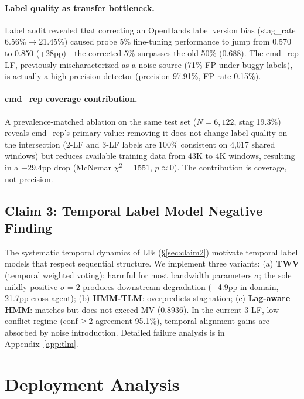 \documentclass[11pt,a4paper]{article}
\begin{document}
\paragraph{Label quality as transfer bottleneck.}
Label audit revealed that correcting an OpenHands label version bias (stag\_rate 6.56\%$\to$21.45\%) caused probe 5\% fine-tuning performance to jump from 0.570 to 0.850 (+28pp)---the corrected 5\% surpasses the old 50\% (0.688). The cmd\_rep LF, previously mischaracterized as a noise source (71\% FP under buggy labels), is actually a high-precision detector (precision 97.91\%, FP rate 0.15\%).

\paragraph{cmd\_rep coverage contribution.}
A prevalence-matched ablation on the same test set ($N{=}6{,}122$, stag 19.3\%) reveals cmd\_rep's primary value: removing it does not change label quality on the intersection (2-LF and 3-LF labels are 100\% consistent on 4,017 shared windows) but reduces available training data from 43K to 4K windows, resulting in a $-$29.4pp drop (McNemar $\chi^2{=}1551$, $p{\approx}0$). The contribution is coverage, not precision.

\subsection{Claim 3: Temporal Label Model Negative Finding}
\label{sec:claim3}

The systematic temporal dynamics of LFs (\S\ref{sec:claim2}) motivate temporal label models that respect sequential structure. We implement three variants: (a) \textbf{TWV} (temporal weighted voting): harmful for most bandwidth parameters $\sigma$; the sole mildly positive $\sigma{=}2$ produces downstream degradation ($-$4.9pp in-domain, $-$21.7pp cross-agent); (b) \textbf{HMM-TLM}: overpredicts stagnation; (c) \textbf{Lag-aware HMM}: matches but does not exceed MV (0.8936). In the current 3-LF, low-conflict regime (conf$\geq$2 agreement 95.1\%), temporal alignment gains are absorbed by noise introduction. Detailed failure analysis is in Appendix~\ref{app:tlm}.

\section{Deployment Analysis}
\label{sec:deployment}
\end{document}
